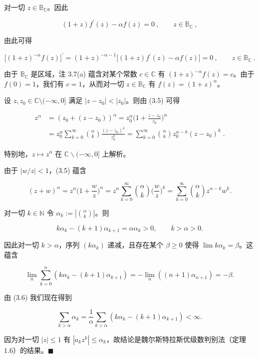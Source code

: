 \begin{theorem}
对一切 $ z \in \mathbb{B}_{\mathbb{C}} $。因此

\[
(1+z)f^{\prime}(z)-\alpha f(z)=0~,\qquad z\in\mathbb{B}_{\mathbb{C}}~,
\]

由此可得

\[
\bigl[(1+z)^{-\alpha}f(z)\bigr]^{\prime}=(1+z)^{-\alpha-1}\bigl[(1+z)f^{\prime}(z)-\alpha f(z)\bigr]=0~,\qquad z\in\mathbb{B}_{\mathbb{C}}~.
\]

由于 $\mathbb{B}_{\mathbb{C}}$ 是区域，注 3.7(a) 蕴含对某个常数 $c\in\mathbb{C}$ 有 $(1+z)^{-\alpha}f(z)=c$。由于 $f(0)=1$，我们有 $c=1$，从而对一切 $z\in\mathbb{B}_{\mathbb{C}}$ 有 $f(z)=(1+z)^{\alpha}$。

\begin{subitems}
\item[（ii）]

设 $ z, z_0 \in \mathbb{C} \setminus (-\infty, 0] $ 满足 $ |z - z_0| < |z_0| $。则由 (3.5) 可得

\begin{equation*}
\begin{aligned}
z^{\alpha}&=\left(z_{0}+(z-z_{0})\right)^{\alpha}=z_{0}^{\alpha}\Big(1+\frac{z-z_{0}}{z_{0}}\Big)^{\alpha}\\&=z_{0}^{\alpha}\sum_{k=0}^{\infty}\binom{\alpha}{k}\frac{(z-z_{0})^{k}}{z_{0}^{k}}=\sum_{k=0}^{\infty}\binom{\alpha}{k}z_{0}^{\alpha-k}(z-z_{0})^{k}\;.
\end{aligned}
\end{equation*}

特别地，$ z \mapsto z^\alpha $ 在 $ \mathbb{C}\backslash(-\infty,0] $ 上解析。

\item[（iii）]

由于 $ |w/z| < 1 $，(3.5) 蕴含

\[
(z+w)^{\alpha}=z^{\alpha}\Big(1+\frac{w}{z}\Big)^{\alpha}=z^{\alpha}\sum_{k=0}^{\infty}\binom{\alpha}{k}\Big(\frac{w}{z}\Big)^{k}=\sum_{k=0}^{\infty}\binom{\alpha}{k}z^{\alpha-k}w^{k}.
\]
\item[（iv）]

对一切 $ k \in \mathbb{N} $ 令 $ \alpha_k := \left| \binom{\alpha}{k} \right| $。则

\begin{equation}
k\alpha_{k}-(k+1)\alpha_{k+1}=\alpha\alpha_{k}>0,\qquad k>\alpha>0.
\end{equation}

因此对一切 $ k > \alpha $，序列 $ (k\alpha_k) $ 递减，且存在某个 $ \beta \geq 0 $ 使得 $ \lim k\alpha_k = \beta $。这蕴含

\[
\lim_{n}\sum_{k=0}^{n}\left(k\alpha_{k}-(k+1)\alpha_{k+1}\right)=-\lim_{n}\left((n+1)\alpha_{n+1}\right)=-\beta.
\]

由 (3.6) 我们现在得到

\[
\sum_{k>\alpha}\alpha_{k}=\frac{1}{\alpha}\sum_{k>\alpha}\left(k\alpha_{k}-(k+1)\alpha_{k+1}\right)<\infty.
\]

因为对一切 $ |z| \leq 1 $ 有 $ |a_k z^k| \leq \alpha_k $，故结论是魏尔斯特拉斯优级数判别法（定理 1.6）的结果。$ \blacksquare $

\end{subitems}

\end{theorem}

